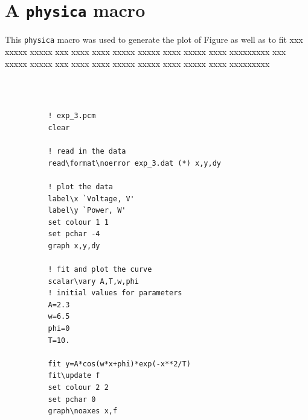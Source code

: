 \documentclass[12pt]{article}
\begin{document}
    \newpage
    \section{A {\tt physica} macro}
    \label{app:macro}
    This {\tt physica} macro was used to generate the plot of Figure
    as well as to fit xxx xxxxx xxxxx xxx xxxx xxxx xxxxx xxxxx xxxx xxxxx xxxx xxxxxxxxx
    xxx xxxxx xxxxx xxx xxxx xxxx xxxxx xxxxx xxxx xxxxx xxxx xxxxxxxxx
    
    {\tt 
    \begin{verbatim}
    
          ! exp_3.pcm
          clear
          
          ! read in the data
          read\format\noerror exp_3.dat (*) x,y,dy
    
          ! plot the data
          label\x `Voltage, V'
          label\y `Power, W'
          set colour 1 1
          set pchar -4
          graph x,y,dy
    
          ! fit and plot the curve
          scalar\vary A,T,w,phi
          ! initial values for parameters
          A=2.3
          w=6.5
          phi=0
          T=10.
    
          fit y=A*cos(w*x+phi)*exp(-x**2/T)
          fit\update f
          set colour 2 2
          set pchar 0
          graph\noaxes x,f
    
    \end{verbatim}
    }
\end{document}
